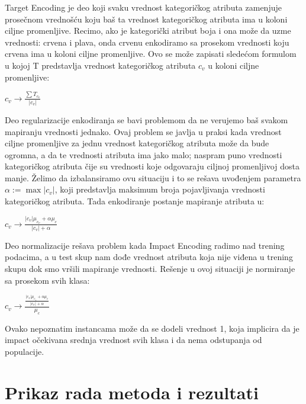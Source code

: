\documentclass[12pt,oneside]{memoir}
\begin{document}
Target Encoding je deo koji svaku vrednost kategoričkog atributa zamenjuje prosečnom vrednošću koju baš ta vrednost kategoričkog atributa ima u koloni ciljne promenljive. Recimo, ako je kategorički atribut boja i ona može da uzme vrednosti: crvena i plava, onda crvenu enkodiramo sa prosekom vrednosti koju crvena ima u koloni ciljne promenljive. Ovo se može zapisati sledećom formulom u kojoj T predstavlja vrednost kategoričkog atributa $c_v$ u koloni ciljne promenljive: 

\begin{center}
$c_v \to \frac{\sum{T_{c_v}}}{|c_v|}$ 
\end{center}
Deo regularizacije enkodiranja se bavi problemom da ne verujemo baš svakom mapiranju vrednosti jednako. Ovaj problem se javlja u praksi kada vrednost ciljne promenljive za jednu vrednost kategoričkog atributa može da bude ogromna, a da te vrednosti atributa ima jako malo; naspram puno vrednosti kategoričkog atributa čije su vrednosti koje odgovaraju ciljnoj promenljivoj dosta manje. Želimo da izbalansiramo ovu situaciju i to se rešava uvođenjem parametra $\alpha := \max |c_v|$, koji predstavlja maksimum broja pojavljivanja vrednosti kategoričkog atributa. Tada enkodiranje postanje mapiranje atributa u: 

\begin{center}
$c_v \to \frac{|c_v|\mu_{c_v} + \alpha\mu_c}{|c_v| + \alpha}$
\end{center}
Deo normalizacije rešava problem kada Impact Encoding radimo nad trening podacima, a u test skup nam dođe vrednost atributa koja nije viđena u trening skupu dok smo vršili mapiranje vrednosti. Rešenje u ovoj situaciji je normiranje sa prosekom svih klasa:
\begin{center}
$c_v \to \frac{\frac{|c_v|\mu_{c_v} + \alpha\mu_c}{|c_v| + \alpha}}{\mu_{c}}$
\end{center}
Ovako nepoznatim instancama može da se dodeli vrednost 1, koja implicira da je impact očekivana srednja vrednost svih klasa i da nema odstupanja od populacije.


\chapter{Prikaz rada metoda i rezultati}
\end{document}
